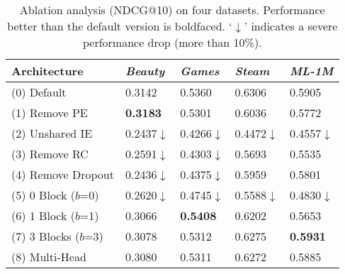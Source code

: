 \documentclass[conference]{IEEEtran}
\begin{document}
\begin{table}[h]
\centering
\caption{Ablation analysis (NDCG@10) on four datasets. Performance better than the default version is boldfaced. `$\downarrow$' indicates a severe performance drop (more than 10\%).}
\begin{tabular}{lllll}
\toprule
Architecture				& \emph{Beauty}		&	\emph{Games}	&	\emph{Steam}	&	\emph{ML-1M}\\ \midrule                               
(0) Default  				&	0.3142				&	0.5360					&	0.6306				&	0.5905 \\
(1) Remove PE        	 	&	\textbf{0.3183}		&	0.5301					&	0.6036				&	0.5772 \\
(2) Unshared IE				&	0.2437$\downarrow$	&	0.4266$\downarrow$		&	0.4472$\downarrow$	&	0.4557$\downarrow$ \\
(3) Remove RC        	 	&	0.2591$\downarrow$	&	0.4303$\downarrow$		&	0.5693	&	0.5535 \\
(4) Remove Dropout         	&	0.2436$\downarrow$	&	0.4375$\downarrow$		&	0.5959	&	0.5801 \\
(5) 0 Block ($b$=0)			&	0.2620$\downarrow$  &	0.4745$\downarrow$		&	0.5588$\downarrow$	&	0.4830$\downarrow$ \\
(6) 1 Block ($b$=1)			&	0.3066 				&	\textbf{0.5408}			&	0.6202	&	0.5653 \\
(7) 3 Blocks ($b$=3)			&	0.3078			 	&	0.5312					&	0.6275	&	\textbf{0.5931} \\
(8) Multi-Head 			  	&	0.3080				&	0.5311					&	0.6272	&	0.5885 \\
\bottomrule
\end{tabular}
\label{tb:ablation}
\end{table}
\end{document}
